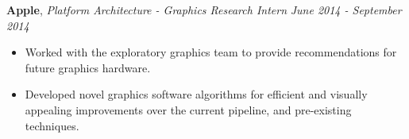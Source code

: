 \documentclass[9pt]{article}
\newenvironment{changemargin}[2]{%
  \begin{list}{}{%
    \setlength{\topsep}{0pt}%
    \setlength{\leftmargin}{#1}%
    \setlength{\rightmargin}{#2}%
    \setlength{\listparindent}{\parindent}%
    \setlength{\itemindent}{\parindent}%
    \setlength{\parsep}{\parskip}%
  }%
  \item[]}{\end{list}
}
\newenvironment{body} {
	\vspace*{-16pt}
	\begin{changemargin}{-0.25in}{-0.5in}
  }	
	{\end{changemargin}
}
\begin{document}
\begin{body}
\begin{itemize}
	\end{itemize}
	\vspace*{-2pt}
	\textbf{Apple}, \emph{Platform Architecture - Graphics Research Intern} \hfill \emph{June 2014 - September 2014}\\
	\vspace*{-3pt}
	\begin{itemize} \itemsep -0pt %
	\item Worked with the exploratory graphics team to provide recommendations for future graphics hardware.
	\item Developed novel graphics software algorithms for efficient and visually appealing improvements over the current pipeline, and pre-existing techniques.
	\end{itemize}

\end{body}
\end{document}
